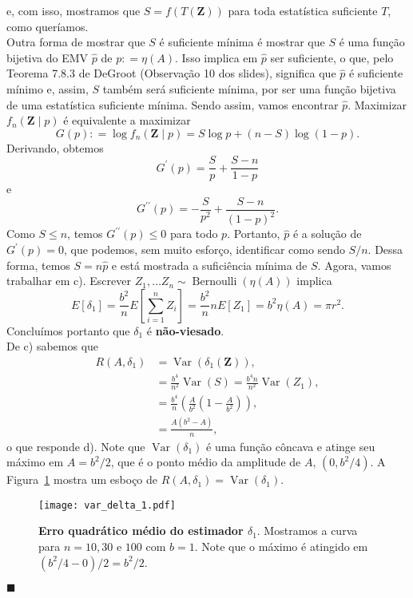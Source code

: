\documentclass[a4paper,10pt, notitlepage]{report}
\newcommand{\vr}{\operatorname{Var}} %
\begin{document}
{$$$$
e, com isso, mostramos que $S = f(T(\boldsymbol{Z}))$ para toda estatística suficiente $T$, como queríamos.
\\
Outra forma de mostrar que $S$ é suficiente mínima é mostrar que $S$ é uma função bijetiva do EMV $\hat{ p }$ de $p : = \eta ( A )$.
Isso implica em $\hat{ p }$ ser suficiente, o que, pelo Teorema 7.8.3 de DeGroot (Observação 10 dos slides), significa que $\hat{ p }$ é suficiente mínimo e, assim, $S$ também será suficiente mínima, por ser uma função bijetiva de uma estatística suficiente mínima.
Sendo assim, vamos encontrar $\hat{ p }$.
Maximizar $f_{ n } ( \boldsymbol{Z} \mid p )$ é equivalente a maximizar
\begin{equation*}
    G ( p ) : = \log f_{ n } ( \boldsymbol{Z} \mid p ) = S \log p + ( n - S ) \log ( 1 - p ).
\end{equation*}
Derivando, obtemos
\begin{equation*}
    G^\prime ( p ) = \frac{ S }{ p } + \frac{ S - n }{ 1 - p }
\end{equation*}
e
\begin{equation*}
    G^{\prime\prime} ( p ) = - \frac{ S }{ p^2 } + \frac{ S - n }{ ( 1 - p )^2 }.
    \end{equation*}
Como $S \leq n$, temos $G^{\prime\prime}(p) \leq 0$ para todo $p$.
Portanto, $\hat{ p }$ é a solução de $G^\prime(p) = 0$, que podemos, sem muito esforço, identificar como sendo $S/n$.
Dessa forma, temos $S = n \hat{ p }$ e está mostrada a suficiência mínima de $S$.
Agora, vamos trabalhar em c).
Escrever $Z_1, \ldots Z_n \sim \operatorname{Bernoulli}(\eta(A))$ implica
$$
E[\delta_1] = \frac{b^2}{n}E\left[\sum_{i=1}^n Z_i\right] = \frac{b^2}{n} n E[Z_1] = b^2\eta(A) = \pi r^2.
$$
Concluímos portanto que $\delta_1$ é \textbf{não-viesado}.
\\
De c) sabemos que 
\begin{align*}
R(A, \delta_1) &= \vr\left(\delta_1(\boldsymbol{Z})\right),\\
&= \frac{b^4}{n^2}\vr(S) = \frac{b^4n}{n^2}\vr(Z_1),\\
&= \frac{b^4}{n}\left(\frac{A}{b^2}\left(1-\frac{A}{b^2}\right)\right),\\
&= \frac{A(b^2-A)}{n},
\end{align*}
o que responde d).
Note que $\vr(\delta_1)$ é uma função côncava e atinge seu máximo em $A = b^2/2$, que é o ponto médio da amplitude de $A$, $(0, b^2/4)$.
A Figura~\ref{fig:var_delta_1} mostra um esboço de $R(A, \delta_1) = \vr\left(\delta_1\right)$.
\begin{figure}[!ht]
\begin{center}
\texttt{[image: var\_delta\_1.pdf]}    
\end{center}
\caption{\textbf{Erro quadrático médio do estimador $\delta_1$}.
Mostramos a curva para $n=10, 30$ e $100$ com $b=1$.
Note que o máximo é atingido em $(b^2/4 - 0)/2 = b^2/2$.
}
\label{fig:var_delta_1}
\end{figure}
$\blacksquare$
}
\newpage
\end{document}
